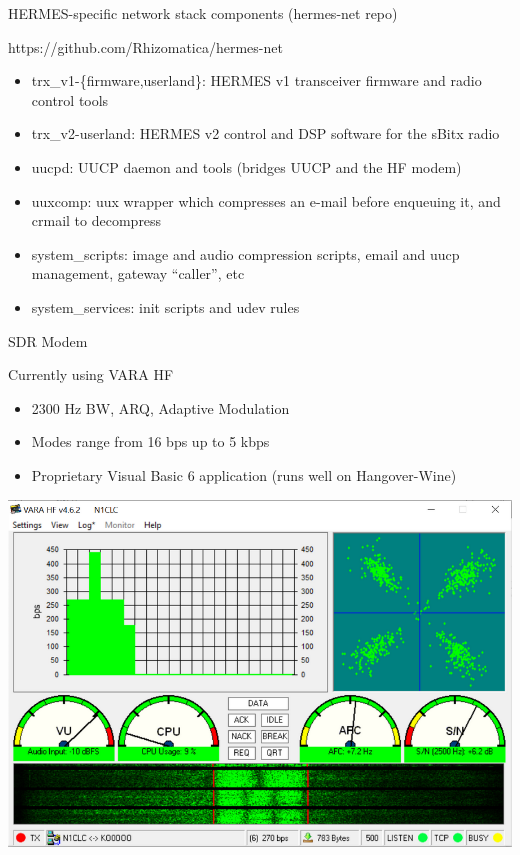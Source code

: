 \documentclass[aspectratio=169,xcolor={x11names,svgnames,dvipsnames}]{beamer}
\begin{document}
\begin{frame}{HERMES-specific network stack components (hermes-net repo)}

\begin{block}{https://github.com/Rhizomatica/hermes-net}
    \begin{itemize}
    \item trx\_v1-\{firmware,userland\}: HERMES v1 transceiver firmware and radio control tools
    \item trx\_v2-userland: HERMES v2 control and DSP software for the sBitx radio
    \item uucpd: UUCP daemon and tools (bridges UUCP and the HF modem)
    \item uuxcomp: uux wrapper which compresses an e-mail before enqueuing it, and crmail to decompress
    \item system\_scripts: image and audio compression scripts, email and uucp management, gateway ``caller'', etc
    \item system\_services: init scripts and udev rules
    \end{itemize}
  \end{block}

\end{frame}


\begin{frame}{SDR Modem}
\begin{block}{Currently using VARA HF}
    \begin{itemize}
    \item 2300 Hz BW, ARQ, Adaptive Modulation
    \item Modes range from 16 bps up to 5 kbps
    \item Proprietary Visual Basic 6 application (runs well on Hangover-Wine)
    \end{itemize}
  \end{block}

\begin{center}
  \vspace{-0.15cm}\includegraphics[width=.42\columnwidth]{vara.png}
\end{center}
\end{frame}
\end{document}
